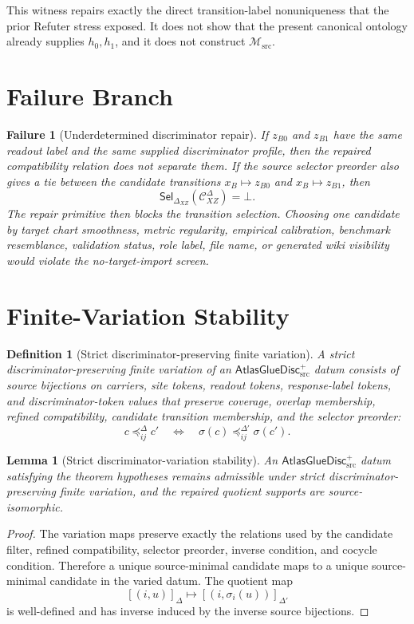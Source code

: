 \documentclass[11pt]{article}
\newcommand{\Msrc}{\mathcal{M}_{\mathrm{src}}}
\newcommand{\AtlasGlueDisc}{\mathsf{AtlasGlueDisc}_{\mathrm{src}}^{+}}
\newcommand{\Cand}{\mathcal{C}^{\Delta}}
\newcommand{\Sel}{\mathsf{Sel}_{\Delta}}
\newtheorem{definition}{Definition}
\newtheorem{lemma}{Lemma}
\newtheorem{failure}{Failure}
\begin{document}
This witness repairs exactly the direct transition-label nonuniqueness that
the prior Refuter stress exposed. It does not show that the present canonical
ontology already supplies \(h_0,h_1\), and it does not construct \(\Msrc\).

\section{Failure Branch}

\begin{failure}[Underdetermined discriminator repair]
If \(z_{B0}\) and \(z_{B1}\) have the same readout label and the same supplied
discriminator profile, then the repaired compatibility relation does not
separate them. If the source selector preorder also gives a tie between the
candidate transitions \(x_B\mapsto z_{B0}\) and \(x_B\mapsto z_{B1}\), then
\[
  \Sel_{XZ}(\Cand_{XZ})=\bot.
\]
The repair primitive then blocks the transition selection. Choosing one
candidate by target chart smoothness, metric regularity, empirical calibration,
benchmark resemblance, validation status, role label, file name, or generated
wiki visibility would violate the no-target-import screen.
\end{failure}

\section{Finite-Variation Stability}

\begin{definition}[Strict discriminator-preserving finite variation]
A strict discriminator-preserving finite variation of an \(\AtlasGlueDisc\)
datum consists of source bijections on carriers, site tokens, readout tokens,
response-label tokens, and discriminator-token values that preserve coverage,
overlap membership, refined compatibility, candidate transition membership,
and the selector preorder:
\[
  c\preceq_{ij}^{\Delta}c'
  \quad\Longleftrightarrow\quad
  \sigma(c)\preceq_{ij}^{\Delta\prime}\sigma(c').
\]
\end{definition}

\begin{lemma}[Strict discriminator-variation stability]
An \(\AtlasGlueDisc\) datum satisfying the theorem hypotheses remains
admissible under strict discriminator-preserving finite variation, and the
repaired quotient supports are source-isomorphic.
\end{lemma}

\begin{proof}
The variation maps preserve exactly the relations used by the candidate
filter, refined compatibility, selector preorder, inverse condition, and
cocycle condition. Therefore a unique source-minimal candidate maps to a
unique source-minimal candidate in the varied datum. The quotient map
\[
  [(i,u)]_{\Delta}\mapsto[(i,\sigma_i(u))]_{\Delta'}
\]
is well-defined and has inverse induced by the inverse source bijections.
\end{proof}
\end{document}
